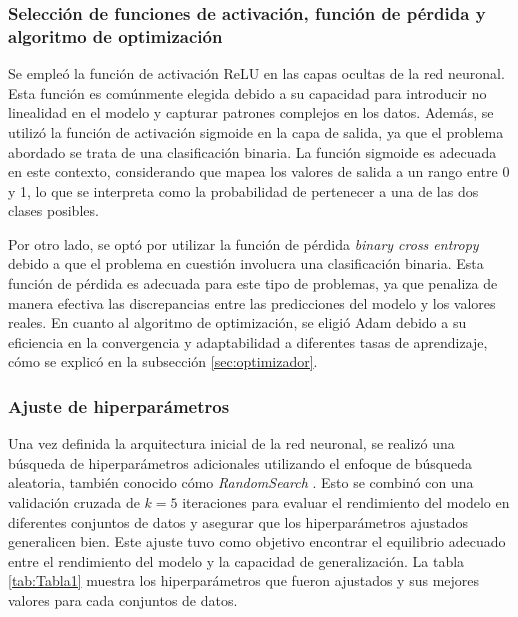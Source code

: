 \subsubsection{Selección de funciones de activación, función de pérdida y algoritmo de optimización}
Se empleó la función de activación ReLU en las capas ocultas de la red neuronal. Esta función es 
comúnmente elegida debido a su capacidad para introducir no linealidad en el modelo y capturar 
patrones complejos en los datos. Además, se utilizó la función de activación sigmoide en la capa 
de salida, ya que el problema abordado se trata de una clasificación binaria. La función sigmoide
 es adecuada en este contexto, considerando que mapea los valores de salida a un rango entre 0 y 1, 
 lo que se interpreta como la probabilidad de pertenecer a una de las dos clases posibles.

 Por otro lado, se optó por utilizar la función de pérdida \emph{binary cross entropy} debido a 
 que el problema en cuestión involucra una clasificación binaria. Esta función de pérdida es 
 adecuada para este tipo de problemas, ya que penaliza de manera efectiva las discrepancias 
 entre las predicciones del modelo y los valores reales. En cuanto al algoritmo de optimización, 
 se eligió Adam debido a su eficiencia en la convergencia y adaptabilidad a diferentes tasas de 
 aprendizaje, cómo se explicó en la subsección \ref{sec:optimizador}.

\subsubsection{Ajuste de hiperparámetros}

Una vez definida la arquitectura inicial de la red neuronal, se realizó una búsqueda de hiperparámetros 
adicionales utilizando el enfoque de búsqueda aleatoria, también conocido cómo \emph{RandomSearch} \citep{CITE:50}. 
Esto se combinó con una validación cruzada de $k=5$ iteraciones para evaluar el rendimiento del modelo en diferentes 
conjuntos de datos y asegurar que los hiperparámetros ajustados generalicen bien. Este ajuste tuvo como objetivo 
encontrar el equilibrio adecuado entre el rendimiento del modelo y la capacidad de generalización. 
La tabla \ref{tab:Tabla1} muestra los hiperparámetros que fueron ajustados y sus mejores valores 
para cada conjuntos de datos.

